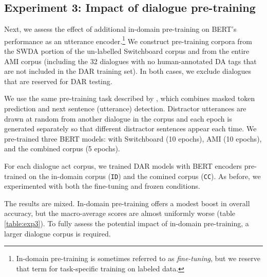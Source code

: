 \documentclass[11pt,a4paper]{article}
\begin{document}
\subsection{Experiment 3: Impact of dialogue pre-training} \label{sec:experiment3} %

Next, we assess the effect of additional in-domain pre-training on BERT's performance as an utterance encoder.\footnote{
In-domain pre-training is sometimes referred to as \textit{fine-tuning}, but we reserve that term for task-specific training on labeled data.}
We construct pre-training corpora from the SWDA portion of the un-labelled Switchboard corpus and from the entire AMI corpus (including the 32 dialogues with no human-annotated DA tags that are not included in the DAR training set).
In both cases, we exclude dialogues that are reserved for DAR testing.

We use the same pre-training task described by \citet{devlinBERTPretrainingDeep2018}, which combines masked token prediction and next sentence (utterance) detection. 
Distractor utterances are drawn at random from another dialogue in the corpus
and each epoch is generated separately so that different distractor sentences appear each time.
We pre-trained three BERT models: with Switchboard (10 epochs), AMI (10 epochs), and the combined corpus (5 epochs).

For each dialogue act corpus, we trained DAR models with BERT encoders pre-trained on the in-domain corpus (\texttt{ID}) and the comined corpus (\texttt{CC}).
As before, we experimented with both the fine-tuning and frozen conditions.

The results are mixed.
In-domain pre-training offers a modest boost in overall accuracy,
but the macro-average scores are almost uniformly worse (table \ref{table:exp3}).
To fully assess the potential impact of in-domain pre-training, a larger dialogue corpus is required.
\end{document}
